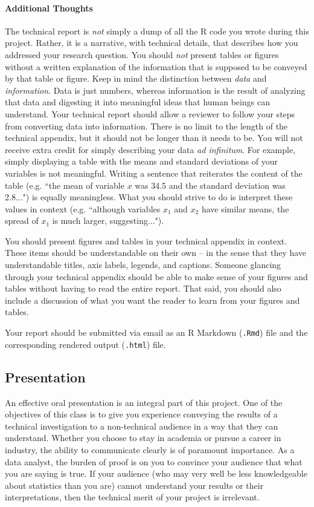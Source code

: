 \documentclass[10pt]{article}
\begin{document}
\paragraph{Additional Thoughts}

The technical report is \emph{not} simply a dump of all the R code you wrote during this project. Rather, it is a narrative, with technical details, that describes how you addressed your research question. You should \emph{not} present tables or figures without a written explanation of the information that is supposed to be conveyed by that table or figure. Keep in mind the distinction between \emph{data} and \emph{information}. Data is just numbers, whereas information is the result of analyzing that data and digesting it into meaningful ideas that human beings can understand. Your technical report should allow a reviewer to follow your steps from converting data into information. There is no limit to the length of the technical appendix, but it should not be longer than it needs to be. You will not receive extra credit for simply describing your data \emph{ad infinitum}. For example, simply displaying a table with the means and standard deviations of your variables is not meaningful. Writing a sentence that reiterates the content of the table (e.g. ``the mean of variable $x$ was 34.5 and the standard deviation was 2.8...") is equally meaningless. What you should strive to do is interpret these values in context (e.g. ``although variables $x_1$ and $x_2$ have similar means, the spread of $x_1$ is much larger, suggesting..."). 

You should present figures and tables in your technical appendix in context. These items should be understandable on their own -- in the sense that they have understandable titles, axis labels, legends, and captions. Someone glancing through your technical appendix should be able to make sense of your figures and tables without having to read the entire report. That said, you should also include a discussion of what you want the reader to learn from your figures and tables. 

Your report should be submitted via email as an R Markdown (\texttt{.Rmd}) file and the corresponding rendered output (\texttt{.html}) file.

\subsection{Presentation}

An effective oral presentation is an integral part of this project. One of the objectives of this class is to give you experience conveying the results of a technical investigation to a non-technical audience in a way that they can understand. Whether you choose to stay in academia or pursue a career in industry, the ability to communicate clearly is of paramount importance. As a data analyst, the burden of proof is on you to convince your audience that what you are saying is true. If your audience (who may very well be less knowledgeable about statistics than you are) cannot understand your results or their interpretations, then the technical merit of your project is irrelevant. 
\end{document}
